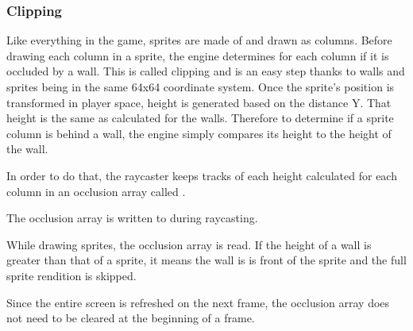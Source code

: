 \par












\subsubsection{Clipping}
Like everything in the game, sprites are made of and drawn as columns. Before drawing each column in a sprite, the engine determines for each column if it is occluded by a wall. This is called clipping and is an easy step thanks to walls and sprites being in the same 64x64 coordinate system. Once the sprite's position is transformed in player space, height is generated based on the distance Y. That height is the same as calculated for the walls. Therefore to determine if a sprite column is behind a wall, the engine simply compares its height to the height of the wall.\\
\par
In order to do that, the raycaster keeps tracks of each height calculated for each column in an occlusion array called .\\
\par
\begin{minipage}{\textwidth}

\end{minipage}
\par
The occlusion array is written to during raycasting.\\
\par
\begin{minipage}{\textwidth}

\end{minipage}
While drawing sprites, the occlusion array is read. If the height of a wall is greater than that of a sprite, it means the wall is is front of the sprite and the full sprite rendition is skipped.\\
\par
\begin{minipage}{\textwidth}

\end{minipage}
\par
Since the entire screen is refreshed on the next frame, the occlusion array does not need to be cleared at the beginning of a frame.\\


